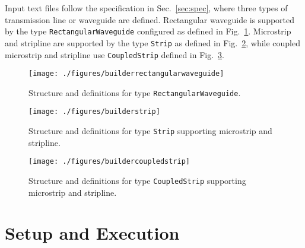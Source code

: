 \documentclass[titlepage]{article}
\renewcommand\_{\textunderscore\linebreak[1]}
\begin{document}
Input text files follow the specification in Sec.~\ref{sec:spec}, where three types of transmission line or waveguide are defined.  Rectangular waveguide is supported by the type \texttt{RectangularWaveguide} configured as defined in Fig.~\ref{fig:rectangular_waveguide}.  Microstrip and stripline are supported by the type \texttt{Strip} as defined in Fig.~\ref{fig:strip}, while coupled microstrip and stripline use \texttt{CoupledStrip} defined in Fig.~\ref{fig:coupled_strip}.

\begin{figure}[ht]
  \centering
  \texttt{[image: ./figures/builder\_rectangular\_waveguide]}
  \caption{Structure and definitions for type \texttt{RectangularWaveguide}.}
  \label{fig:rectangular_waveguide}
\end{figure}

\begin{figure}[ht]
  \centering
  \texttt{[image: ./figures/builder\_strip]}
  \caption{Structure and definitions for type \texttt{Strip} supporting microstrip and stripline.}
  \label{fig:strip}
\end{figure}

\begin{figure}[ht]
  \centering
  \texttt{[image: ./figures/builder\_coupled\_strip]}
  \caption{Structure and definitions for type \texttt{CoupledStrip} supporting microstrip and stripline.}
  \label{fig:coupled_strip}
\end{figure}

\section{Setup and Execution}
\end{document}

